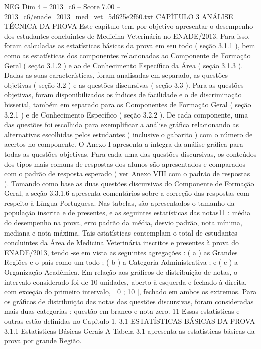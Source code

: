 \begin{textsample}{NEG Dim 4 – 2013\_c6 – Score 7.00 – 2013\_c6/enade\_2013\_med\_vet\_5d625e2f60.txt}  \label{ex:f4_neg_309}
CAPÍTULO 3 ANÁLISE TÉCNICA DA PROVA Este capítulo tem por objetivo apresentar o desempenho dos estudantes concluintes de Medicina Veterinária no ENADE/2013.
Para isso, foram calculadas as estatísticas básicas da prova em seu todo ( seção 3.1.1 ), bem como as estatísticas dos componentes relacionadas ao Componente de Formação Geral ( seção 3.1.2 ) e ao de Conhecimento Específico da Área ( seção 3.1.3 ).
Dadas as suas características, foram analisadas em separado, as questões objetivas ( seção 3.2 ) e as questões discursivas ( seção 3.3 ).
Para as questões objetivas, foram disponibilizados os índices de facilidade e o de discriminação bisserial, também em separado para os Componentes de Formação Geral ( seção 3.2.1 ) e de Conhecimento Específico ( seção 3.2.2 ).
De cada componente, uma das questões foi escolhida para exemplificar a análise gráfica relacionando as alternativas escolhidas pelos estudantes ( inclusive o gabarito ) com o número de acertos no componente.
O Anexo I apresenta a íntegra da análise gráfica para todas as questões objetivas.
Para cada uma das questões discursivas, os conteúdos dos tipos mais comuns de respostas dos alunos são apresentados e comparados com o padrão de resposta esperado ( ver Anexo VIII com o padrão de respostas ).
Tomando como base as duas questões discursivas do Componente de Formação Geral, a seção 3.3.1.6 apresenta comentários sobre a correção das respostas com respeito à Língua Portuguesa.
Nas tabelas, são apresentados o tamanho da população inscrita e de presentes, e as seguintes estatísticas das notas11 : média do desempenho na prova, erro padrão da média, desvio padrão, nota mínima, mediana e nota máxima.
Tais estatísticas contemplam o total de estudantes concluintes da Área de Medicina Veterinária inscritos e presentes à prova do ENADE/2013, tendo -se em vista as seguintes agregações : ( a ) as Grandes Regiões e o país como um todo ; ( b ) a Categoria Administrativa ; e ( c ) a Organização Acadêmica.
Em relação aos gráficos de distribuição de notas, o intervalo considerado foi de 10 unidades, aberto à esquerda e fechado à direita, com exceção do primeiro intervalo, [ 0 ; 10 ], fechado em ambos os extremos.
Para os gráficos de distribuição das notas das questões discursivas, foram consideradas mais duas categorias : questão em branco e nota zero. 11 Essas estatísticas e outras estão definidas no Capítulo 1. 3.1 ESTATÍSTICAS BÁSICAS DA PROVA 3.1.1 Estatísticas Básicas Gerais A Tabela 3.1 apresenta as estatísticas básicas da prova por grande Região.

\end{textsample}
